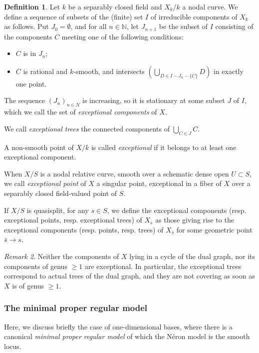 \documentclass[a4paper,12pt]{amsart} %
\numberwithin{equation}{subsection}
\def\NN{\mathbb N}
\theoremstyle{definition}
\newtheorem{definition}{Definition}[section]
\theoremstyle{plain}%
\theoremstyle{remark}
\newtheorem{remark}[definition]{Remark}
\begin{document}
\begin{definition}\label{definition exceptional point/component/tree}
Let $k$ be a separably closed field and $X_k/k$ a nodal curve. We define a sequence of subsets of the (finite) set $I$ of irreducible components of $X_k$ as follows. Put $J_0=\emptyset$, and for all $n\in\NN$, let $J_{n+1}$ be the subset of $I$ consisting of the components $C$ meeting one of the following conditions:
\begin{itemize}
\item $C$ is in $J_n$;
\item $C$ is rational and $k$-smooth, and intersects $\left(\bigcup\limits_{D\in I-J_n-\{C\}} D\right)$ in exactly one point.
\end{itemize}
The sequence $(J_n)_{n\in N}$ is increasing, so it is stationary at some subset $J$ of $I$, which we call the set of \emph{exceptional components} of $X$.

	We call \emph{exceptional trees} the connected components of $\bigcup\limits_{C\in J}C$.

	A non-smooth point of $X/k$ is called \emph{exceptional} if it belongs to at least one exceptional component.
	
	When $X/S$ is a nodal relative curve, smooth over a schematic dense open $U\subset S$, we call \emph{exceptional point} of $X$ a singular point, exceptional in a fiber of $X$ over a separably closed field-valued point of $S$.
	
	If $X/S$ is quasisplit, for any $s\in S$, we define the exceptional components (resp. exceptional points, resp. exceptional trees) of $X_s$ as those giving rise to the exceptional components (resp. points, resp. trees) of $X_{\bar s}$ for some geometric point $\bar s\to s$.
\end{definition}

\begin{remark}
Neither the components of $X$ lying in a cycle of the dual graph, nor its components of genus $\geq 1$ are exceptional. In particular, the exceptional trees correspond to actual trees of the dual graph, and they are not covering as soon as $X$ is of genus $\geq 1$.
\end{remark}

\subsubsection{The minimal proper regular model}

Here, we discuss briefly the case of one-dimensional bases, where there is a canonical \emph{minimal proper regular model} of which the N\'eron model is the smooth locus.
\end{document}
